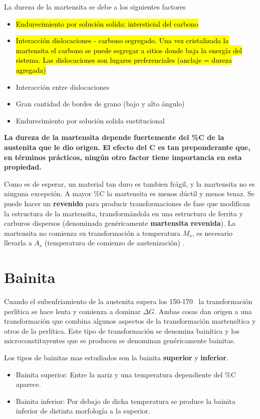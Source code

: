 La dureza de la martensita se debe a los siguientes factores
\begin{itemize}
    \item \hl{Endurecimiento por solución solida: intersticial del carbono}
    \item \hl{Interacción dislocaciones - carbono segregado. Una vez cristalizada la martensita el carbono se puede segregar a sitios donde baja la energía del sistema. Las dislocaciones son lugares preferenciales (anclaje = dureza agregada)}
    \item Interacción entre dislocaciones
    \item Gran cantidad de bordes de grano (bajo y alto ángulo)
    \item Endurecimiento por solución solida sustitucional
\end{itemize}

\textbf{La dureza de la martensita depende fuertemente del \%C de la austenita que le dio origen. El efecto del C es tan preponderante que, en términos prácticos, ningún otro factor tiene importancia en esta propiedad.}

Como es de esperar, un material tan duro es tambien frágil, y la martensita no es ninguna excepción. A mayor \%C la martensita es menos dúctil y menos tenaz. Se puede hacer un \textbf{revenido} para producir transformaciones de fase que modifican la estructura de la martensita, transformándola en una estructura de ferrita y carburos dispersos (denominada genéricamente \textbf{martensita revenida}). La martensita no comienza su transformación a temperatura $M_s$, es necesario llevarla a $A_s$ (temperatura de comienzo de austenización) \cite{gottstein2013physical}.

\section{Bainita}

Cuando el subenfriamiento de la austenita supera los 150-170\grad~ la transformación perlítica se hace lenta y comienza a dominar $\Delta G$. Ambas cosas dan origen a una transformación que combina algunos aspectos de la transformación martensítica y otros de la perlítica. Este tipo de transformación se denomina bainítica y los microconstituyentes que se producen se denominan genéricamente bainitas.

Los tipos de bainitas mas estudiados son la bainita \textbf{superior} y \textbf{inferior}.

\begin{itemize}
    \item Bainita superior: Entre la nariz y una temperatura dependiente del \%C aparece.
    \item Bainita inferior: Por debajo de dicha temperatura se produce la bainita inferior de distinta morfología a la superior.
\end{itemize}

